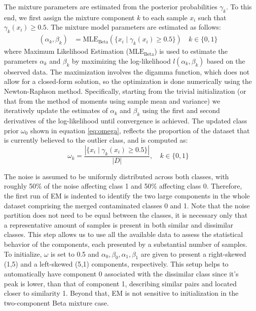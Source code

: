 \documentclass[lettersize,journal]{IEEEtran}
\begin{document}
\vskip 0.15cm
The mixture parameters are estimated from the posterior probabilities $\gamma_k$. To this end, we first assign the mixture component $k$ to each sample $x_i$ such that $\gamma_k (x_i) \geq 0.5$. The mixture model parameters are estimated as follows:
\begin{align}
(\alpha_k, \beta_k) &= \text{MLE}_{\text{Beta}}(\{ x_i \mid \gamma_k(x_i) \geq 0.5 \}) \quad k \in \{0, 1\}
\label{eq:alphak}
\end{align}
where Maximum Likelihood Estimation ($\text{MLE}_{\text{Beta}}$) is used to estimate the parameters 
$\alpha_k$ and $\beta_k$ by maximizing the log-likelihood $l(\alpha_k, \beta_k)$ based on the observed data.
The maximization involves the digamma function, which does not allow for a closed-form solution, so the optimization is done numerically using the Newton-Raphson method. Specifically, starting from the trivial initialization (or that from the method of moments using sample mean and variance) we iteratively update the estimates of $\alpha_k$ and $\beta_k$ using the first and second derivatives of the log-likelihood until convergence is achieved.
The updated class prior $\omega_0$ shown in equation \ref{eq:omega}, reflects the proportion of the dataset that is currently believed to the outlier class, and is computed as:
\begin{equation}
    \omega_k = \frac{|\{ x_i \mid \gamma_k(x_i) \geq 0.5 \}|}{|D|}, \quad k \in \{0, 1\}
    \label{eq:omega}
\end{equation}

The noise is assumed to be uniformly distributed across both classes, with roughly 50\% of the noise affecting class 1 and 50\% affecting class 0. Therefore, the 
first run of EM is indented to identify the two large components in the whole dataset comprising the merged contaminated classes 0 and 1. Note that the noise partition does not need to be equal between the classes, it is necessary only that a representative amount of samples is present in both similar and dissimilar classes. This step allows us to use all the available data to assess the statistical behavior of the components, each presented by a substantial number of samples. 
To initialize, $\omega$ is set to 0.5 and $\alpha_0, \beta_0, \alpha_1,\beta_1$ are given to present a right-skewed (1,5) and a left-skewed (5,1) components, respectively. This setup helps to automatically have component 0 associated with the dissimilar class since it's peak is lower, than that of component 1, describing similar pairs and located closer to similarity 1. Beyond that, EM is not sensitive to initialization in the two-component Beta mixture case.
\end{document}
